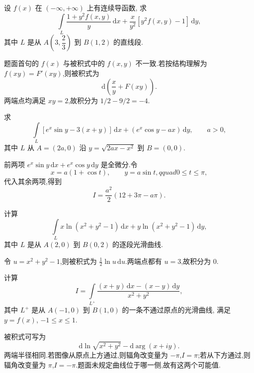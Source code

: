 \begin{example}
    设 $f(x)$ 在 $(-\infty,+\infty)$ 上有连续导函数, 求
    \[
        \displaystyle\int\limits_L
        \dfrac{1+y^2f(x,y)}{y}\,\mathrm{d}x
        +\dfrac{x}{y^2}\left\lbrack y^2f(x,y)-1\right\rbrack\,\mathrm{d}y,
    \]
    其中 $L$ 是从 $A(3,\dfrac{2}{3})$ 到 $B(1,2)$ 的直线段.
\end{example}
\exampleblank

\begin{solution}
    题面首句的 $f(x)$ 与被积式中的 $f(x,y)$ 不一致.若按结构理解为 $f(xy)=F'(xy)$,则被积式为
    \[
        \mathrm{d}\left(\dfrac{x}{y}+F(xy)\right).
    \]
    两端点均满足 $xy=2$,故积分为 $1/2-9/2=-4$.
\end{solution}

\begin{example}
    求
    \[
        \displaystyle\int\limits_L[ e^x\sin y-3(x+y)]\,\mathrm{d}x+(e^x\cos y-ax)\,\mathrm{d}y,
        \qquad a>0,
    \]
    其中 $L$ 从 $A=(2a,0)$ 沿 $y=\sqrt{2ax-x^2}$ 到 $B=(0,0)$.
\end{example}
\exampleblank

\begin{solution}
    前两项 $e^x\sin y\,\mathrm{d}x+e^x\cos y\,\mathrm{d}y$ 是全微分.令
    \[
        x=a(1+\cos t),\qquad y=a\sin t,qquad0\leq t\leq\pi,
    \]
    代入其余两项,得到
    \[
        I=\dfrac{a^2}{2}\left(12+3\pi-a\pi\right).
    \]
\end{solution}

\begin{example}
    计算
    \[
        \displaystyle\int\limits_Lx\ln(x^2+y^2-1)\,\mathrm{d}x+y\ln(x^2+y^2-1)\,\mathrm{d}y,
    \]
    其中 $L$ 是从 $A(2,0)$ 到 $B(0,2)$ 的逐段光滑曲线.
\end{example}
\exampleblank

\begin{solution}
    令 $u=x^2+y^2-1$,则被积式为 $\frac{1}{2}\ln u\,\mathrm{d}u$.两端点都有 $u=3$,故积分为 $0$.
\end{solution}

\begin{example}
    计算
    \[
        I=\int\limits_{L^+}\dfrac{(x+y)\,\mathrm{d}x-(x-y)\,\mathrm{d}y}{x^2+y^2},
    \]
    其中 $L^+$ 是从 $A(-1,0)$ 到 $B(1,0)$ 的一条不通过原点的光滑曲线, 满足 $y=f(x)$, $-1\leq x\leq1$.
\end{example}
\exampleblank

\begin{solution}
    被积式可写为
    \[
        \mathrm{d}\ln\sqrt{x^2+y^2}-\mathrm{d}\arg(x+iy).
    \]
    两端半径相同.若图像从原点上方通过,则辐角改变量为 $-\pi$,$I=\pi$;若从下方通过,则辐角改变量为 $\pi$,$I=-\pi$.题面未规定曲线位于哪一侧,故有这两个可能值.
\end{solution}

